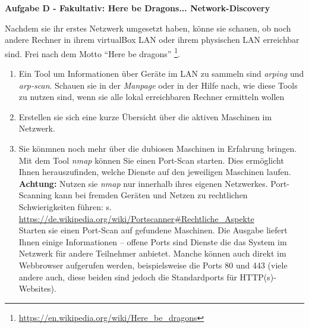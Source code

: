 \documentclass[paper=a4,fontsize=11pt]{scrartcl}%
\begin{document}
\begin{center}\Large{\textbf{Aufgabe D - Fakultativ: Here be Dragons... Network-Discovery}}\end{center}\vskip0.25in
Nachdem sie ihr erstes Netzwerk umgesetzt haben, könne sie schauen, ob noch andere Rechner in ihrem virtualBox LAN oder ihrem physischen LAN erreichbar sind. Frei nach dem Motto \enquote{Here be dragons} \footnote{\url{https://en.wikipedia.org/wiki/Here_be_dragons}}.
\begin{enumerate}
	\item Ein Tool um Informationen über Geräte im LAN zu sammeln sind \emph{arping} und \emph{arp-scan}. Schauen sie in der \emph{Manpage} oder in der Hilfe nach, wie diese Tools zu nutzen sind, wenn sie alle lokal erreichbaren Rechner ermitteln wollen
	\item Erstellen sie sich eine kurze Übersicht über die aktiven Maschinen im Netzwerk.
	\item Sie könmnen noch mehr über die dubiosen Maschinen in Erfahrung bringen. Mit dem Tool \emph{nmap} können Sie einen Port-Scan starten. Dies ermöglicht Ihnen herauszufinden, welche Dienste auf den jeweiligen Maschinen laufen. \textbf{Achtung:} Nutzen sie \emph{nmap} nur innerhalb ihres eigenen Netzwerkes. Port-Scanning kann bei fremden Geräten und Netzen zu rechtlichen Schwierigkeiten führen: s. \url{https://de.wikipedia.org/wiki/Portscanner#Rechtliche_Aspekte}\\
	Starten sie einen Port-Scan auf gefundene Maschinen. Die Ausgabe liefert Ihnen einige Informationen -- offene Ports sind Dienste die das System im Netzwerk für andere Teilnehmer anbietet. Manche können auch direkt im Webbrowser aufgerufen werden, beispielsweise die Ports 80 und 443 (viele andere auch, diese beiden sind jedoch die Standardports für HTTP(s)-Websites).
\end{enumerate}
\end{document}
